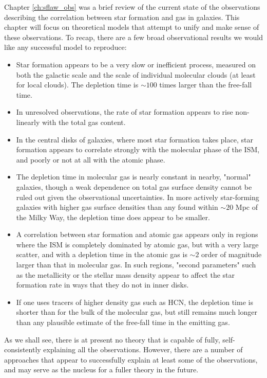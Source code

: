 Chapter \ref{ch:sflaw_obs} was a brief review of the current state of the observations describing the correlation between star formation and gas in galaxies. This chapter will focus on theoretical models that attempt to unify and make sense of these observations. To recap, there are a few broad observational results we would like any successful model to reproduce:
\begin{itemize}
\item Star formation appears to be a very slow or inefficient process, measured on both the galactic scale and the scale of individual molecular clouds (at least for local clouds). The depletion time is $\sim 100$ times larger than the free-fall time.
\item In unresolved observations, the rate of star formation appears to rise non-linearly with the total gas content.
\item In the central disks of galaxies, where most star formation takes place, star formation appears to correlate strongly with the molecular phase of the ISM, and poorly or not at all with the atomic phase.
\item The depletion time in molecular gas is nearly constant in nearby, "normal" galaxies, though a weak dependence on total gas surface density cannot be ruled out given the observational uncertainties. In more actively star-forming galaxies with higher gas surface densities than any found within $\sim 20$ Mpc of the Milky Way, the depletion time does appear to be smaller.
\item  A correlation between star formation and atomic gas appears only in regions where the ISM is completely dominated by atomic gas, but with a very large scatter, and with a depletion time in the atomic gas is $\sim 2$ order of magnitude larger than that in molecular gas. In such regions, "second parameters" such as the metallicity or the stellar mass density appear to affect the star formation rate in ways that they do not in inner disks.
\item If one uses tracers of higher density gas such as HCN, the depletion time is shorter than for the bulk of the molecular gas, but still remains much longer than any plausible estimate of the free-fall time in the emitting gas.
\end{itemize}
As we shall see, there is at present no theory that is capable of fully, self-consistently explaining all the observations. However, there are a number of approaches that appear to successfully explain at least some of the observations, and may serve as the nucleus for a fuller theory in the future.

